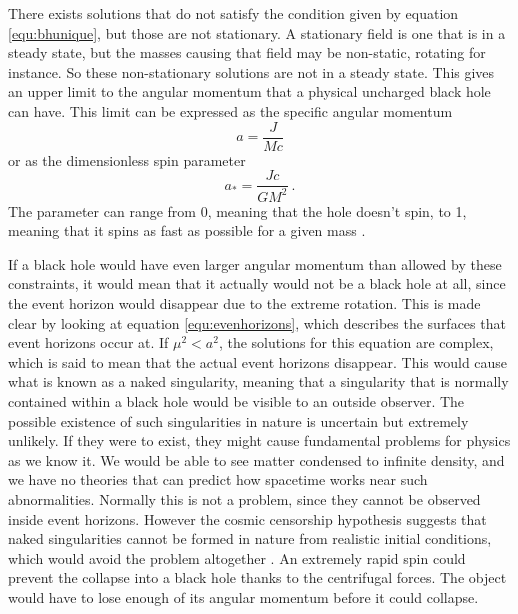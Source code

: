 \documentclass[english, oneside]{HYgradu}
\begin{document}
There exists solutions that do not satisfy the condition given by equation \ref{equ:bhunique}, but those are not stationary. A stationary field is one that is in a steady state, but the masses causing that field may be non-static, rotating for instance. So these non-stationary solutions are not in a steady state. This gives an upper limit to the angular momentum that a physical uncharged black hole can have. This limit can be expressed as the specific angular momentum 
\begin{equation} \label{equ:angularmomentum}
a = \frac{J}{Mc}
\end{equation}
or as the dimensionless spin parameter
\begin{equation}
a_* = \frac{Jc}{GM^2} \ .
\end{equation}
The parameter can range from 0, meaning that the hole doesn't spin, to 1, meaning that it spins as fast as possible for a given mass \citep{middleton:2016}.

If a black hole would have even larger angular momentum than allowed by these constraints, it would mean that it actually would not be a black hole at all, since the event horizon would disappear due to the extreme rotation. This is made clear by looking at equation \ref{equ:evenhorizons}, which describes the surfaces that event horizons occur at. If $\mu^2 < a^2$, the solutions for this equation are complex, which is said to mean that the actual event horizons disappear. This would cause what is known as a naked singularity, meaning that a singularity that is normally contained within a black hole would be visible to an outside observer. The possible existence of such singularities in nature is uncertain but extremely unlikely. If they were to exist, they might cause fundamental problems for physics as we know it. We would be able to see matter condensed to infinite density, and we have no theories that can predict how spacetime works near such abnormalities. Normally this is not a problem, since they cannot be observed inside event horizons. However the cosmic censorship hypothesis suggests that naked singularities cannot be formed in nature from realistic initial conditions, which would avoid the problem altogether \citep{wald:1997}. An extremely rapid spin could prevent the collapse into a black hole thanks to the centrifugal forces. The object would have to lose enough of its angular momentum before it could collapse.
\end{document}
